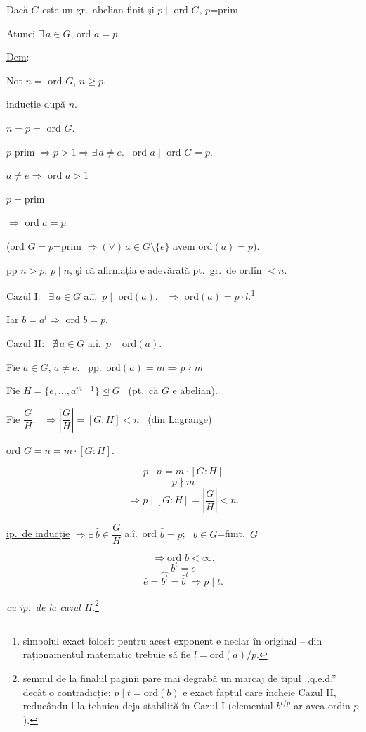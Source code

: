 \documentclass[12pt]{article}
\begin{document}
\begin{center}
\end{center}

\bigskip
\noindent Dacă $G$ este un gr.\ abelian finit şi $p\mid$ ord $G$, $p$=prim

\noindent Atunci $\exists\, a\in G$, ord $a=p$.

\bigskip
\noindent\underline{Dem}:

\noindent Not $n=$ ord $G$, $n\geq p$.

\noindent inducție după $n$.

\bigskip
\noindent $n=p=$ ord $G$.

\noindent $p$ prim $\Rightarrow p>1 \Rightarrow \exists\, a\neq e$. \ ord $a\mid$ ord $G=p$.

\noindent $a\neq e \Rightarrow$ ord $a>1$

\noindent $p=$prim

\noindent $\Rightarrow$ ord $a=p$.

\bigskip
\noindent\big(ord $G=p$=prim $\Rightarrow (\forall)\,a\in G\setminus\{e\}$ avem ord$(a)=p$\big).

\bigskip
\noindent pp $n>p$, $p\mid n$, şi că afirmația e adevărată pt.\ gr.\ de ordin $<n$.

\bigskip
\noindent\underline{Cazul I}: \ $\exists\, a\in G$ a.î.\ $p\mid$ ord$(a)$. \ $\Rightarrow$ ord$(a)=p\cdot l$.\footnote{simbolul exact folosit pentru acest exponent e neclar în original -- din raționamentul matematic trebuie să fie $l=\text{ord}(a)/p$.}

\noindent Iar $b=a^l \Rightarrow$ ord $b=p$.

\bigskip
\noindent\underline{Cazul II}: \ $\nexists\, a\in G$ a.î.\ $p\mid$ ord$(a)$.

\bigskip
\noindent Fie $a\in G$, $a\neq e$. \ pp.\ ord$(a)=m \Rightarrow p\nmid m$

\noindent Fie $H=\{e,\ldots,a^{m-1}\}\trianglelefteq G$ \ (pt.\ că $G$ e abelian).

\noindent Fie $\dfrac{G}{H}$. \ $\Rightarrow \left|\dfrac{G}{H}\right| = [G:H] < n$ \ (din Lagrange)

\bigskip
\noindent ord $G = n = m\cdot[G:H]$.

\[
p\mid n = m\cdot[G:H]
\]
\[
p\nmid m
\]
\[
\Rightarrow p\mid [G:H] = \left|\dfrac{G}{H}\right| < n.
\]

\bigskip
\noindent\underline{ip.\ de inducție} $\Rightarrow \exists\, \hat b\in \dfrac{G}{H}$ a.î.\ ord $\hat b=p$; \ $b\in G$=finit.\ $G$

\[
\Rightarrow \text{ord } b<\infty.
\]
\[
b^t=e
\]
\[
\hat e=\widehat{b^t}=\hat b^t \Rightarrow p\mid t.
\]

\noindent\textit{cu ip.\ de la cazul II.}\footnote{semnul de la finalul paginii pare mai degrabă un marcaj de tipul ,,q.e.d.'' decât o contradicție: $p\mid t=\text{ord}(b)$ e exact faptul care încheie Cazul II, reducându-l la tehnica deja stabilită în Cazul I (elementul $b^{t/p}$ ar avea ordin $p$).}
\end{document}
